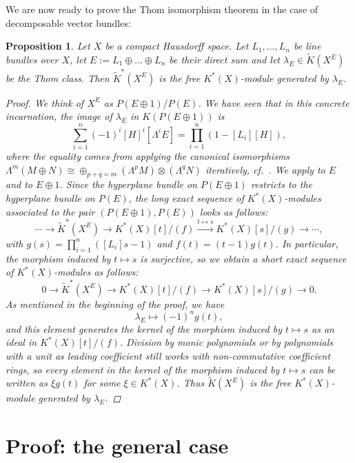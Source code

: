 \documentclass[12pt,a4paper]{amsart}
\theoremstyle{plain}
\newtheorem{prop}[thm]{Proposition}
\theoremstyle{definition}
\theoremstyle{remark}
\begin{document}
We are now ready to prove the Thom isomorphism theorem in the case of decomposable vector bundles:

\begin{prop}\label{prop:sumthom}
  Let $X$ be a compact Hausdorff space.
  Let $L_{1}, \ldots, L_{n}$ be line bundles over $X$, let $E := L_{1} \oplus \ldots \oplus L_{n}$ be their direct sum and let $\lambda_{E} \in \tilde{K}(X^{E})$ be the Thom class.
  Then $\tilde{K}^{*}(X^{E})$ is the free $K^{*}(X)$-module generated by $\lambda_{E}$.
  \begin{proof}
    We think of $X^{E}$ as $P(E \oplus 1)/P(E)$.
    We have seen that in this concrete incarnation, the image of $\lambda_{E}$ in $K(P(E\oplus 1))$ is
    \[ \sum_{i=1}^{n} (-1)^{i}[H]^{i}[\Lambda^{i}E] = \prod_{i=1}^{n}(1 - [L_{i}][H]), \]
    where the equality comes from applying the canonical isomorphisms $\Lambda^{m}(M\oplus N) \cong \oplus_{p+q = m} (\Lambda^{p}M )\otimes (\Lambda^{q}N)$ iteratively, cf.~\cite[p.~42]{wir12}.
    We apply  to $E$ and to $E \oplus 1$.
    Since the hyperplane bundle on $P(E \oplus 1)$ restricts to the hyperplane bundle on $P(E)$, the long exact sequence of $K^{*}(X)$-modules associated to the pair $(P(E \oplus 1), P(E))$ looks as follows:
    \[ \cdots \to \tilde{K}^{*}(X^{E}) \to K^{*}(X)[t]/(f) \xrightarrow{t \mapsto s} K^{*}(X)[s]/(g) \to \cdots, \]
    with $g(s) = \prod_{i=1}^{n}([L_{i}]s -1)$ and $f(t) = (t-1)g(t)$.
    In particular, the morphism induced by $t \mapsto s$ is surjective, so we obtain a short exact sequence of $K^{*}(X)$-modules as follows:
    \[ 0 \to \tilde{K}^{*}(X^{E}) \to K^{*}(X)[t]/(f) \to K^{*}(X)[s]/(g) \to 0. \]
    As mentioned in the beginning of the proof, we have
    \[ \lambda_{E} \mapsto (-1)^{n}g(t), \]
    and this element generates the kernel of the morphism induced by $t \mapsto s$ as an ideal in $K^{*}(X)[t]/(f)$.
    Division by monic polynomials or by polynomials with a unit as leading coefficient still works with non-commutative coefficient rings, so every element in the kernel of the morphism induced by $t \mapsto s$ can be written as $\xi g(t)$ for some $\xi \in K^{*}(X)$.
    Thus $\tilde{K}(X^{E})$ is the free $K^{*}(X)$-module generated by $\lambda_{E}$.
  \end{proof}
\end{prop}

\section{Proof: the general case}
\end{document}
